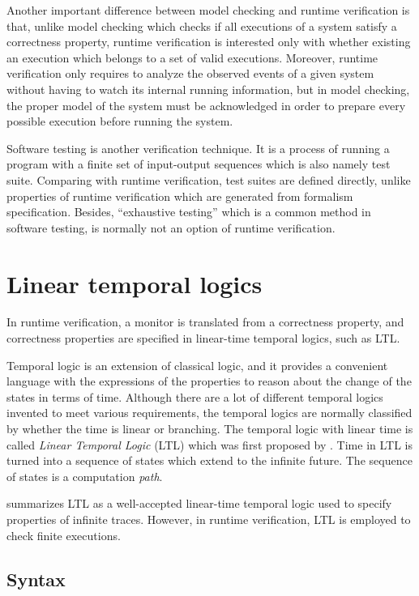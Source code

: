 Another important difference between model checking and runtime verification is that, unlike model checking which checks if all executions of a system satisfy a correctness property, runtime verification is interested only with whether existing an execution which belongs to a set of valid executions. Moreover, runtime verification only requires to analyze the observed events of a given system without having to watch its internal running information, but in model checking, the proper model of the system must be acknowledged in order to prepare every possible execution before running the system. \citep{leucker2009brief}

Software testing \citep{broy2005model} is another verification technique. It is a process of running a program with a finite set of input-output sequences which is also namely test suite. Comparing with runtime verification, test suites are defined directly, unlike properties of runtime verification which are generated from formalism specification. Besides, ``exhaustive testing'' which is a common method in software testing, is normally not an option of runtime verification.

\section{Linear temporal logics}

In runtime verification, a monitor is translated from a correctness property, and correctness properties are specified in linear-time temporal logics, such as LTL.

Temporal logic is an extension of classical logic, and it provides a convenient language with the expressions of the properties to reason about the change of the states in terms of time. Although there are a lot of different temporal logics invented to meet various requirements, the temporal logics are normally classified by whether the time is linear or branching. The temporal logic with linear time is called \emph{Linear Temporal Logic} (LTL) which was first proposed by \cite{pnueli97}. Time in LTL is turned into a sequence of states which extend to the infinite future. The sequence of states is a computation \emph{path}. \citep{clarke1999model} \citep{huth2004}

\cite{leucker2009brief} summarizes LTL as a well-accepted linear-time temporal logic used to specify properties of infinite traces. However, in runtime verification, LTL is employed to check finite executions.

\subsection{Syntax}

